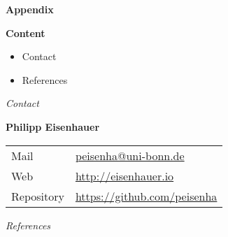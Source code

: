 \beginbackup\appendix
\begin{frame}\begin{center}
\LARGE\textbf{Appendix}
\end{center}\end{frame}
\begin{frame}
\textbf{Content}\medskip
\begin{itemize}\setlength\itemsep{1em}
\item Contact
\item References
\end{itemize}
\end{frame}
\begin{frame}\begin{center}
\LARGE\textit{Contact}
\end{center}\end{frame}
\begin{frame}
\textbf{Philipp Eisenhauer}\\\vspace{0.5cm}
\begin{tabular}{ll}
Mail		    & \href{mailto:peisenha@uni-bonn.de}{peisenha@uni-bonn.de}\\
Web     	  & \url{http://eisenhauer.io} \\
Repository  & \url{https://github.com/peisenha}\\
\end{tabular}
\end{frame}
\begin{frame}\begin{center}
\LARGE\textit{References}
\end{center}\end{frame}
\begin{frame}[allowframebreaks]\frametitle{}

\nocite{Keane.1997,Puterman.1994,Trachter.2015,Stange.2012,Mogstad.2017,Belzil.2017,Eisenhauer.2015}





\end{frame}

\backupend
